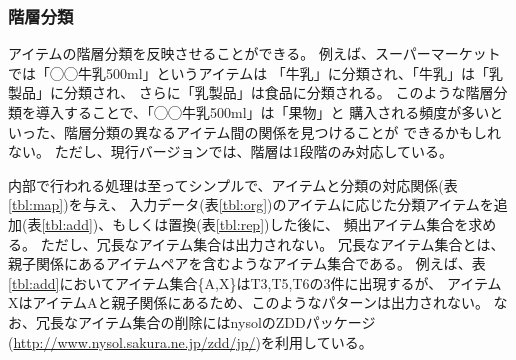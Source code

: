 \subsubsection{階層分類}
アイテムの階層分類を反映させることができる。
例えば、スーパーマーケットでは「◯◯牛乳500ml」というアイテムは
「牛乳」に分類され、「牛乳」は「乳製品」に分類され、
さらに「乳製品」は食品に分類される。
このような階層分類を導入することで、「◯◯牛乳500ml」は「果物」と
購入される頻度が多いといった、階層分類の異なるアイテム間の関係を見つけることが
できるかもしれない。
ただし、現行バージョンでは、階層は1段階のみ対応している。

内部で行われる処理は至ってシンプルで、アイテムと分類の対応関係(表\ref{tbl:map})を与え、
入力データ(表\ref{tbl:org})のアイテムに応じた分類アイテムを追加(表\ref{tbl:add})、もしくは置換(表\ref{tbl:rep})した後に、
頻出アイテム集合を求める。
ただし、冗長なアイテム集合は出力されない。
冗長なアイテム集合とは、親子関係にあるアイテムペアを含むようなアイテム集合である。
例えば、表\ref{tbl:add}においてアイテム集合\{A,X\}はT3,T5,T6の3件に出現するが、
アイテムXはアイテムAと親子関係にあるため、このようなパターンは出力されない。
なお、冗長なアイテム集合の削除にはnysolのZDDパッケージ(\url{http://www.nysol.sakura.ne.jp/zdd/jp/})を利用している。


